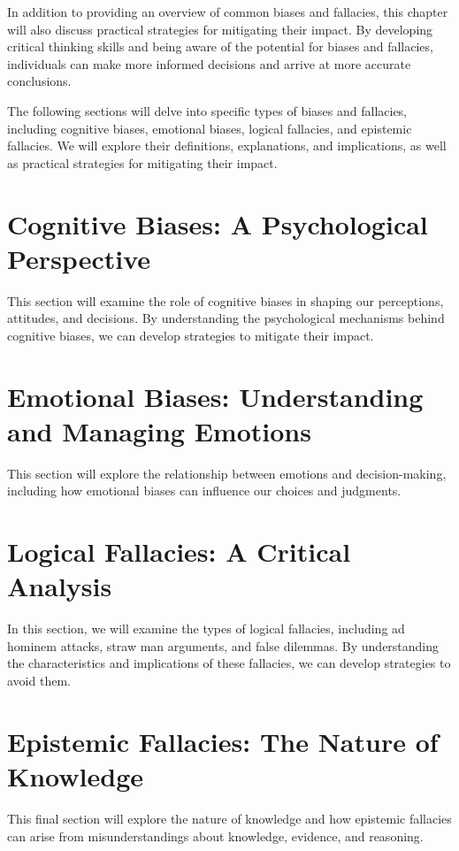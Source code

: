 \documentclass{report}%
\begin{document}
In addition to providing an overview of common biases and fallacies, this chapter will also discuss practical strategies for mitigating their impact. By developing critical thinking skills and being aware of the potential for biases and fallacies, individuals can make more informed decisions and arrive at more accurate conclusions.

The following sections will delve into specific types of biases and fallacies, including cognitive biases, emotional biases, logical fallacies, and epistemic fallacies. We will explore their definitions, explanations, and implications, as well as practical strategies for mitigating their impact.

\section{Cognitive Biases: A Psychological Perspective}

This section will examine the role of cognitive biases in shaping our perceptions, attitudes, and decisions. By understanding the psychological mechanisms behind cognitive biases, we can develop strategies to mitigate their impact.

\section{Emotional Biases: Understanding and Managing Emotions}

This section will explore the relationship between emotions and decision-making, including how emotional biases can influence our choices and judgments.

\section{Logical Fallacies: A Critical Analysis}

In this section, we will examine the types of logical fallacies, including ad hominem attacks, straw man arguments, and false dilemmas. By understanding the characteristics and implications of these fallacies, we can develop strategies to avoid them.

\section{Epistemic Fallacies: The Nature of Knowledge}

This final section will explore the nature of knowledge and how epistemic fallacies can arise from misunderstandings about knowledge, evidence, and reasoning.
\end{document}

